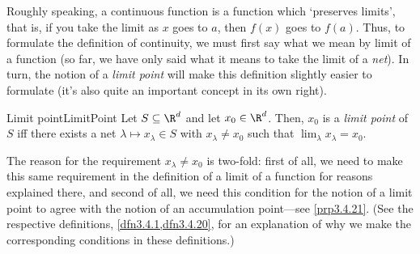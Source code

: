 Roughly speaking, a continuous function is a function which `preserves limits', that is, if you take the limit as $x$ goes to $a$, then $f(x)$ goes to $f(a)$.  Thus, to formulate the definition of continuity, we must first say what we mean by limit of a function (so far, we have only said what it means to take the limit of a \emph{net}).  In turn, the notion of a \emph{limit point} will make this definition slightly easier to formulate (it's also quite an important concept in its own right).
\begin{dfn}{Limit point}{LimitPoint}
Let $S\subseteq \R ^d$ and let $x_0\in \R ^d$.  Then, $x_0$ is a \emph{limit point} of $S$ iff there exists a net $\lambda \mapsto x_\lambda \in S$ with $x_\lambda \neq x_0$ such that $\lim _\lambda x_\lambda =x_0$.
\begin{rmk}
The reason for the requirement $x_\lambda \neq x_0$ is two-fold:  first of all, we need to make this same requirement in the definition of a limit of a function for reasons explained there, and second of all, we need this condition for the notion of a limit point to agree with the notion of an accumulation point---see \cref{prp3.4.21}.  (See the respective definitions, \cref{dfn3.4.1,dfn3.4.20}, for an explanation of why we make the corresponding conditions in these definitions.)
\end{rmk}
\end{dfn}
